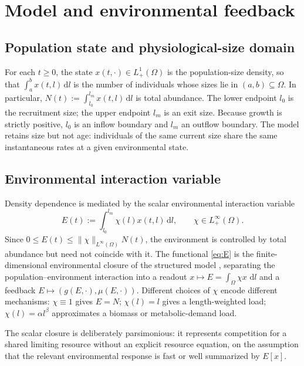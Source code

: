 \documentclass[pdflatex,sn-mathphys-num]{sn-jnl}
\newcommand{\Om}{\Omega}
\newcommand{\dd}{\,\mathrm{d}}
\theoremstyle{plain}
\theoremstyle{definition}
\theoremstyle{remark}
\begin{document}
\section{Model and environmental feedback}\label{sec:model}

\subsection{Population state and physiological-size domain}
\label{subsec:state_space}

For each $t\ge0$, the state $x(t,\cdot)\in L^1_+(\Om)$ is the population-size
density, so that $\int_a^b x(t,l)\dd l$ is the number of individuals whose sizes
lie in $(a,b)\subseteq\Om$. In particular,
$\displaystyle N(t):=\int_{l_0}^{l_m}x(t,l)\dd l$
is total abundance. The lower endpoint $l_0$ is the recruitment size; the upper
endpoint $l_m$ is an exit size. Because growth is strictly positive, $l_0$ is an
inflow boundary and $l_m$ an outflow boundary. The model retains size but not
age: individuals of the same current size share the same instantaneous rates at a
given environmental state.

\subsection{Environmental interaction variable}
\label{subsec:environment}

Density dependence is mediated by the scalar environmental interaction variable
\begin{equation}\label{eq:E}
E(t):=\int_{l_0}^{l_m}\chi(l)x(t,l)\dd l,
\qquad
\chi\in L^\infty_+(\Om).
\end{equation}
Since $0\le E(t)\le \|\chi\|_{L^\infty(\Om)}N(t)$, the environment is controlled by total abundance but need not coincide with it. The functional \eqref{eq:E} is the finite-dimensional environmental closure of the structured model \cite{metz2014dynamics,diekmann2003steady}, separating the population--environment interaction into a readout $x\mapsto E=\int_\Om\chi x\,\dd l$ and a feedback $E\mapsto(g(E,\cdot),\mu(E,\cdot))$. Different choices of $\chi$ encode different mechanisms: $\chi\equiv1$ gives $E=N$; $\chi(l)=l$ gives a length-weighted load; $\chi(l)=\alpha l^\beta$ approximates a biomass or metabolic-demand load.

The scalar closure is deliberately parsimonious: it represents competition for a shared limiting resource without an explicit resource equation, on the assumption that the relevant environmental response is fast or well summarized by $E[x]$.
\end{document}
